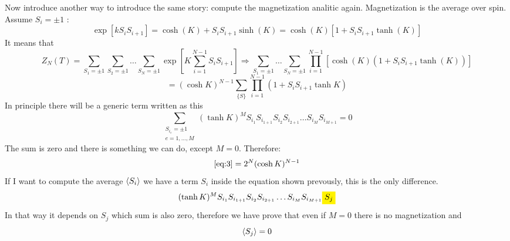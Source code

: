 \documentclass[../main/main.tex]{subfiles}
\begin{document}
Now introduce another way to introduce the same story: compute the magnetization analitic again. Magnetization is the average over spin. Assume \( S_i = \pm 1 \) :
\begin{equation}
  \exp [ k S_i S_{i+1}] = \cosh ( K) + S_i S_{i+1} \sinh (K) = \cosh (K) [1+ S_i S_{i+1} \tanh (K)]
\end{equation}
It means that
\begin{equation}
  Z_N (T) = \sum_{S_1 = \pm 1}^{} \sum_{S_2 = \pm 1}^{} \dots  \sum_{S_N = \pm 1}^{} \exp [
  K  \sum_{i=1}^{N-1} S_i S_{i+1}  ]  \Rightarrow  \sum_{S_1 = \pm 1}^{} \dots  \sum_{S_N = \pm 1}^{} \prod_{i=1}^{N-1} [ \cosh (K) (1+ S_i S_{i+1} \tanh (K))]
\end{equation}
\begin{equation}
  = (\cosh K)^{N-1} \sum_{\{S\}}^{}  \prod_{i=1}^{N-1} ( 1 + S_i S_{i+1} \tanh K )
  \label{eq:3}
\end{equation}
In principle there will be a generic term written as this
\begin{equation}
  \sum_{ \substack{ S_{i_e} = \pm 1\\ e= 1, \dots, M} }^{}  (\tanh K )^M S_{i_1} S_{i_{1+1}} S_{i_2} S_{i_{2+1}} \dots S_{i_M} S_{i_{M+1}} = 0
\end{equation}
The sum is zero and there is something we can do, except \( M=0 \).
Therefore:
\begin{equation}
  \eqref{eq:3} = 2^N (\cosh K)^{N-1}
\end{equation}
If I want to compute the average \( \expval{S_i}  \) we have a term \( S_i \) inside the equation shown prevously, this is the  only difference.
\begin{equation}
  (\tanh K)^M S_{i_1} S_{i_{1+1}} S_{i_2} S_{i_{2+1}} \dots S_{i_M} S_{i_{M+1}} \mathcolorbox{yellow}{S_j}
\end{equation}
In that way it depends on \( S_j \) which sum is also zero, therefore we have prove that even if \( M=0 \)  there is no magnetization and
\begin{equation}
  \expval{S_j} = 0
\end{equation}
\end{document}
